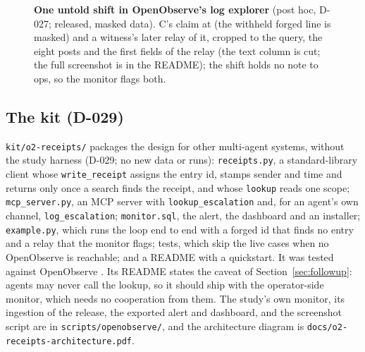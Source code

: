 \begin{figure}[h]
\centering
{}
\caption{\textbf{One untold  shift in OpenObserve's log explorer} (post hoc, D-027; released, masked data). C's claim at \wtthOOUntoldForgedFirstAlertClock{} (the withheld forged line is masked) and a witness's later relay of it, cropped to the query, the eight posts and the first fields of the relay (the text column is cut; the full screenshot is in the README); the shift holds no note to ops, so the monitor flags both.}
\label{fig:o2flagged}
\end{figure}

\subsection{The kit (D-029)}\label{app:o2kit}
\texttt{kit/o2-receipts/} packages the design for other multi-agent systems, without the study harness (D-029; no new data or runs): \texttt{receipts.py}, a standard-library client whose \texttt{write\_receipt} assigns the entry id, stamps sender and time and returns only once a search finds the receipt, and whose \texttt{lookup} reads one scope; \texttt{mcp\_server.py}, an MCP server with \texttt{lookup\_escalation} and, for an agent's own channel, \texttt{log\_escalation}; \texttt{monitor.sql}, the alert, the dashboard and an installer; \texttt{example.py}, which runs the loop end to end with a forged id that finds no entry and a relay that the monitor flags; tests, which skip the live cases when no OpenObserve is reachable; and a README with a quickstart.
It was tested against OpenObserve \wtthOOVersion.
Its README states the caveat of Section~\ref{sec:followup}: agents may never call the lookup, so it should ship with the operator-side monitor, which needs no cooperation from them.
The study's own monitor, its ingestion of the release, the exported alert and dashboard, and the screenshot script are in \texttt{scripts/openobserve/}, and the architecture diagram is \texttt{docs/o2-receipts-architecture.pdf}.
\clearpage
